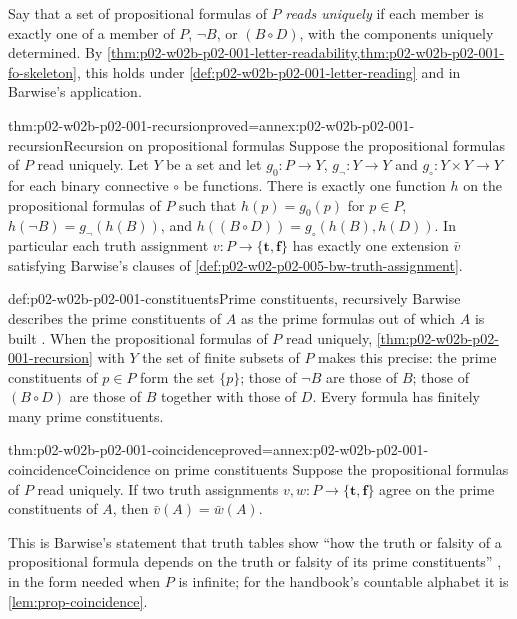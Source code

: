 Say that a set of propositional formulas of \(P\) \emph{reads uniquely} if
each member is exactly one of a member of \(P\), \(\neg B\), or \((B\circ D)\),
with the components uniquely determined.  By
\cref{thm:p02-w02b-p02-001-letter-readability,thm:p02-w02b-p02-001-fo-skeleton},
this holds under \cref{def:p02-w02b-p02-001-letter-reading} and in Barwise's
application.

\begin{hbtheorem}{thm:p02-w02b-p02-001-recursion}{proved=annex:p02-w02b-p02-001-recursion}{Recursion on propositional formulas}
Suppose the propositional formulas of \(P\) read uniquely.  Let \(Y\) be a
set and let \(g_0:P\to Y\), \(g_\neg:Y\to Y\) and
\(g_\circ:Y\times Y\to Y\) for each binary connective \(\circ\) be
functions.  There is exactly one function \(h\) on the propositional
formulas of \(P\) such that \(h(p)=g_0(p)\) for \(p\in P\),
\(h(\neg B)=g_\neg(h(B))\), and \(h((B\circ D))=g_\circ(h(B),h(D))\).
In particular each truth assignment \(v:P\to\{\mathbf t,\mathbf f\}\) has
exactly one extension \(\bar v\) satisfying Barwise's clauses of
\cref{def:p02-w02-p02-005-bw-truth-assignment}.
\end{hbtheorem}

\begin{hbdefinition}{def:p02-w02b-p02-001-constituents}{Prime constituents, recursively}
Barwise describes the prime constituents of \(A\) as the prime formulas out
of which \(A\) is built \cite[ch.~A.1, \S4, p.~23]{Barwise1977FirstOrder}.
When the propositional formulas of \(P\) read uniquely,
\cref{thm:p02-w02b-p02-001-recursion} with \(Y\) the set of finite subsets
of \(P\) makes this precise: the prime constituents of \(p\in P\) form the
set \(\{p\}\); those of \(\neg B\) are those of \(B\); those of \((B\circ D)\)
are those of \(B\) together with those of \(D\).  Every formula has finitely
many prime constituents.
\end{hbdefinition}

\begin{hblemma}{thm:p02-w02b-p02-001-coincidence}{proved=annex:p02-w02b-p02-001-coincidence}{Coincidence on prime constituents}
Suppose the propositional formulas of \(P\) read uniquely.  If two truth
assignments \(v,w:P\to\{\mathbf t,\mathbf f\}\) agree on the prime
constituents of \(A\), then \(\bar v(A)=\bar w(A)\).
\end{hblemma}

This is Barwise's statement that truth tables show ``how the truth or
falsity of a propositional formula depends on the truth or falsity of its
prime constituents'' \cite[ch.~A.1, \S4, p.~24]{Barwise1977FirstOrder}, in
the form needed when \(P\) is infinite; for the handbook's countable
alphabet it is \cref{lem:prop-coincidence}.

